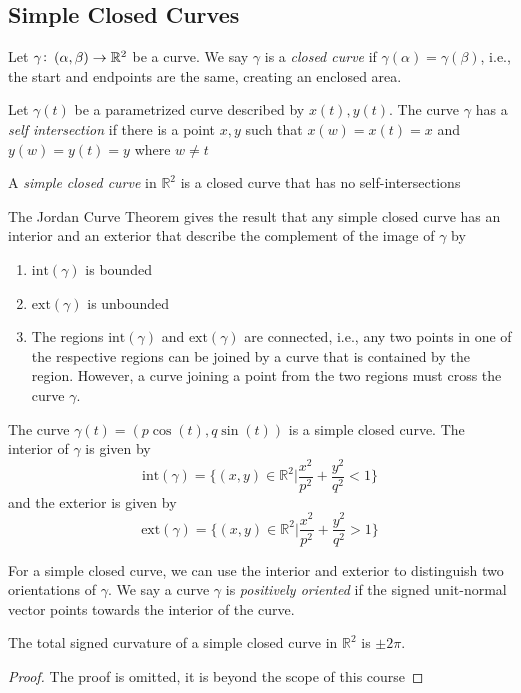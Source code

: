 
\subsection{Simple Closed Curves}

\begin{definition}
  Let \(\gamma \colon \intoo{\alpha, \beta} \rightarrow \mathbb{R}^{2}\) be a curve. We say \(\gamma\) is a \textit{closed curve} if \(\gamma(\alpha) = \gamma(\beta)\), i.e., the start and endpoints are the same, creating an enclosed area.
\end{definition}

\begin{definition}
  Let \(\gamma(t)\) be a parametrized curve described by \(x(t), y(t)\). The curve \(\gamma\) has a \textit{self intersection} if there is a point \(x,y\) such that \(x(w) = x(t) = x\) and \(y(w) = y(t) = y\) where \(w \not = t\)
\end{definition}

\begin{definition}
  A \textit{simple closed curve} in \(\mathbb{R}^{2}\) is a closed curve that has no self-intersections
\end{definition}

The Jordan Curve Theorem gives the result that any simple closed curve has an interior and an exterior that describe the complement of the image of \(
\gamma\) by

\begin{enumerate}
\item
  \(\text{int}(\gamma)\) is bounded
\item
  \(\text{ext}(\gamma)\) is unbounded
\item
  The regions \(\text{int}(\gamma)\) and \(\text{ext}(\gamma)\) are connected, i.e., any two points in one of the respective regions can be joined by a curve that is contained by the region. However, a curve joining a point from the two regions must cross the curve \(\gamma\).
\end{enumerate}

\begin{example}
  The curve \(\gamma(t) = (p\cos(t), q\sin(t))\) is a simple closed curve. The interior of \(\gamma\) is given by
  \[
\text{int}(\gamma) = \{(x,y)\in \mathbb{R}^{2} | \frac{x^{2}}{p^{2}} + \frac{y^{2}}{q^{2}} < 1 \}
\]
  and the exterior is given by
  \[
\text{ext}(\gamma) = \{(x,y)\in \mathbb{R}^{2} | \frac{x^{2}}{p^{2}} + \frac{y^{2}}{q^{2}} > 1 \}
\]
\end{example}

For a simple closed curve, we can use the interior and exterior to distinguish two orientations of \(\gamma\). We say a curve \(\gamma\) is \textit{positively oriented} if the signed unit-normal vector points towards the interior of the curve.

\begin{theorem}
  The total signed curvature of a simple closed curve in \(\mathbb{R}^{2}\) is \(\pm2\pi\).
  \begin{proof}
    The proof is omitted, it is beyond the scope of this course
  \end{proof}
\end{theorem}
